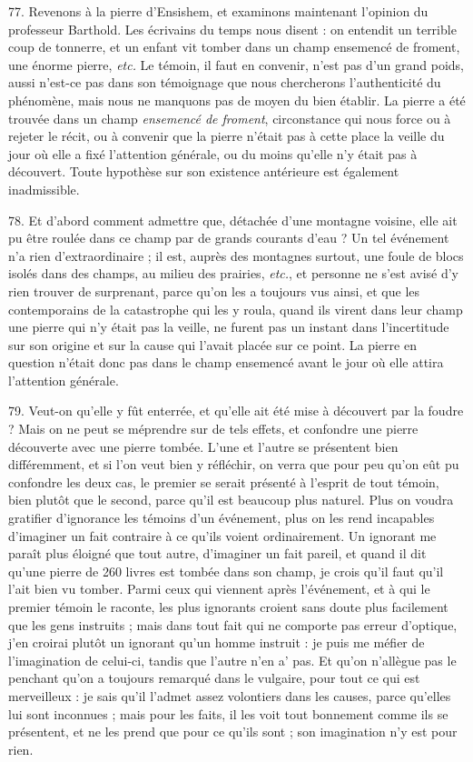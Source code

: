 \documentclass[a4paper, 11pt, oneside, polutonikogreek, french]{article}
\begin{document}
77. Revenons à la pierre d'Ensishem, et examinons maintenant l'opinion du professeur Barthold. Les écrivains du temps nous disent : \og on entendit un terrible coup de tonnerre, et un enfant vit tomber dans un champ ensemencé de froment, une énorme pierre, \emph{etc.} Le témoin, il faut en convenir, n'est pas d'un grand poids, aussi n'est-ce pas dans son témoignage que nous chercherons l'authenticité du phénomène, mais nous ne manquons pas de moyen du bien établir. La pierre a été trouvée dans un champ \emph{ensemencé de froment}, circonstance qui nous force ou à rejeter le récit, ou à convenir que la pierre n'était pas à cette place la veille du jour où elle a fixé l'attention générale, ou du moins qu'elle n'y était pas à découvert. Toute hypothèse sur son existence antérieure est également inadmissible. \fg

78. Et d'abord comment admettre que, détachée d'une montagne voisine, elle ait pu être roulée dans ce champ par de grands courants d'eau ? Un tel événement n'a rien d'extraordinaire ; il est, auprès des montagnes surtout, une foule de blocs isolés dans des champs, au milieu des prairies, \emph{etc.}, et personne ne s'est avisé d'y rien trouver de surprenant, parce qu'on les a toujours vus ainsi, et que les contemporains de la catastrophe qui les y roula, quand ils virent dans leur champ une pierre qui n'y était pas la veille, ne furent pas un instant dans l'incertitude sur son origine et sur la cause qui l'avait placée sur ce point. La pierre en question n'était donc pas dans le champ ensemencé avant le jour où elle attira l'attention générale.

79. Veut-on qu'elle y fût enterrée, et qu'elle ait été mise à découvert par la foudre ? Mais on ne peut se méprendre sur de tels effets, et confondre une pierre découverte avec une pierre tombée. L'une et l'autre se présentent bien différemment, et si l'on veut bien y réfléchir, on verra que pour peu qu'on eût pu confondre les deux cas, le premier se serait présenté à l'esprit de tout témoin, bien plutôt que le second, parce qu'il est beaucoup plus naturel. Plus on voudra gratifier d'ignorance les témoins d'un événement, plus on les rend incapables d'imaginer un fait contraire à ce qu'ils voient ordinairement. Un ignorant me paraît plus éloigné que tout autre, d'imaginer un fait pareil, et quand il dit qu'une pierre de 260 livres est tombée dans son champ, je crois qu'il faut qu'il l'ait bien vu tomber. Parmi ceux qui viennent après l'événement, et à qui le premier témoin le raconte, les plus ignorants croient sans doute plus facilement que les gens instruits ; mais dans tout fait qui ne comporte pas erreur d'optique, j'en croirai plutôt un ignorant qu'un homme instruit : je puis me méfier de l'imagination de celui-ci, tandis que l'autre n'en a' pas. Et qu'on n'allègue pas le penchant qu'on a toujours remarqué dans le vulgaire, pour tout ce qui est merveilleux : je sais qu'il l'admet assez volontiers dans les causes, parce qu'elles lui sont inconnues ; mais pour les faits, il les voit tout bonnement comme ils se présentent, et ne les prend que pour ce qu'ils sont ; son imagination n'y est pour rien.
\end{document}
